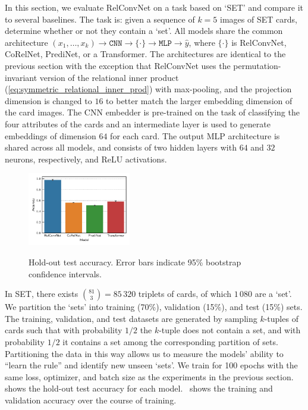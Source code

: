 In this section, we evaluate RelConvNet on a task based on `SET' and compare it to several baselines. The task is: given a sequence of $k=5$ images of SET cards, determine whether or not they contain a `set'. All models share the common architecture $(x_1, \ldots, x_k) \to \texttt{CNN} \to \{ \cdot \} \to \texttt{MLP} \to \hat{y}$, where $\{\cdot\}$ is RelConvNet, CoRelNet, PrediNet, or a Transformer. The architectures are identical to the previous section with the exception that RelConvNet uses the permutation-invariant version of the relational inner product (\cref{eq:symmetric_relational_inner_prod}) with max-pooling, and the projection dimension is changed to $16$ to better match the larger embedding dimension of the card images. The CNN embedder is pre-trained on the task of classifying the four attributes of the cards and an intermediate layer is used to generate embeddings of dimension $64$ for each card. The output MLP architecture is shared across all models, and consists of two hidden layers with $64$ and $32$ neurons, respectively, and ReLU activations.

\begin{figure}
    \centering
    \vskip-10pt
    \includegraphics[width=0.4\textwidth]{figs/experiments/contains_set_acc.pdf}\\[-5pt]
    \caption{\footnotesize{Hold-out test accuracy. Error bars indicate 95\% bootstrap confidence intervals.}}\label{fig:contains_set_acc}
\end{figure}

In SET, there exists $\binom{81}{3} = 85\,320$ triplets of cards, of which $1\,080$ are a `set'. We partition the `sets' into training (70\%), validation (15\%), and test (15\%) sets. The training, validation, and test datasets are generated by sampling $k$-tuples of cards such that with probability $1/2$ the $k$-tuple does not contain a set, and with probability $1/2$ it contains a set among the corresponding partition of sets. Partitioning the data in this way allows us to measure the models' ability to ``learn the rule'' and identify new unseen `sets'. We train for 100 epochs with the same loss, optimizer, and batch size as the experiments in the previous section.~ shows the hold-out test accuracy for each model.~ shows the training and validation accuracy over the course of training.

